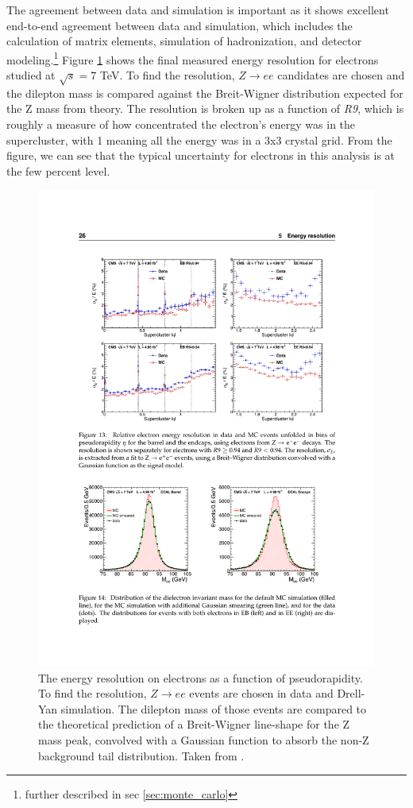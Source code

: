     The agreement between data and simulation is important as it shows excellent end-to-end agreement between data and simulation, which includes the calculation of matrix elements, simulation of hadronization, and detector modeling.\footnote{further described in sec \ref{sec:monte_carlo}} Figure \ref{fig:electron_E_resolution} shows the final measured energy resolution for electrons studied at $\sqrt{s} = 7$ TeV. To find the resolution, $Z \to ee$ candidates are chosen and the dilepton mass is compared against the Breit-Wigner distribution expected for the Z mass from theory. The resolution is broken up as a function of \emph{R9}, which is roughly a measure of how concentrated the electron's energy was in the supercluster, with 1 meaning all the energy was in a 3x3 crystal grid. From the figure, we can see that the typical uncertainty for electrons in this analysis is at the few percent level.
    \begin{figure}[h!]
      \centering
      \includegraphics[width=\textwidth]{figures/electron_E_resolution.pdf}
      \caption[The energy resolution on electrons as a function of pseudorapidity.]{The energy resolution on electrons as a function of pseudorapidity. To find the resolution, $Z\to ee$ events are chosen in data and Drell-Yan simulation. The dilepton mass of those events are compared to the theoretical prediction of a Breit-Wigner line-shape for the Z mass peak, convolved with a Gaussian function to absorb the non-Z background tail distribution. Taken from \cite{ecal_energy_reco}.}
      \label{fig:electron_E_resolution}
    \end{figure}

